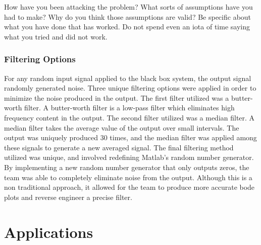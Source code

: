 \documentclass[12pt,letterpaper]{article}
\begin{document}
How have you been attacking the problem?  What sorts of assumptions have you had to make?  Why do you think those assumptions are valid?  Be specific about what you have done that has worked.  Do not spend even an iota of time saying what you tried and did not work.

\subsubsection{Filtering Options}
For any random input signal applied to the black box system, the output signal randomly generated noise. Three unique filtering options were applied in order to minimize the noise produced in the output.  The first filter utilized was a butter-worth filter.  A butter-worth filter is a low-pass filter which eliminates high frequency content in the output.  The second filter utilized was a median filter.  A median filter takes the average value of the output over small intervals. The output was uniquely produced 30 times, and the median filter was applied among these signals to generate a new averaged signal. The final filtering method utilized was unique, and involved redefining Matlab's random number generator. By implementing a new random number generator that only outputs zeros, the team was able to completely eliminate noise from the output.  Although this is a non traditional approach, it allowed for the team to produce more accurate bode plots and reverse engineer a precise filter.
\par



\section{Applications}
\end{document}
